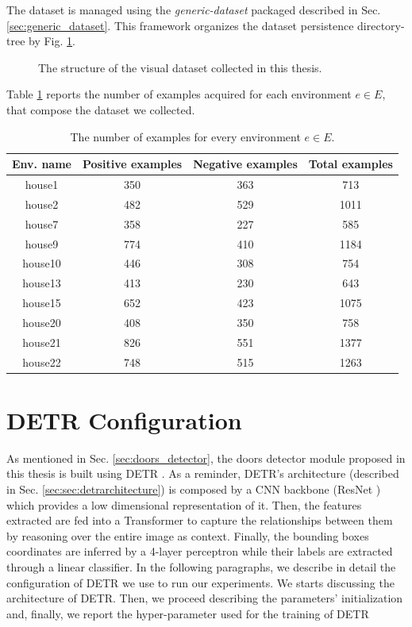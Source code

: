 The dataset is managed using the \textit{generic-dataset} packaged described in Sec. \ref{sec:generic_dataset}. This framework organizes the dataset persistence directory-tree by Fig. \ref{fig:organization_dataset}.

\begin{figure}[h!]
	\centering
	\begin{minipage}{7cm}
	\end{minipage}
	\caption{The structure of the visual dataset collected in this thesis. }
	\label{fig:organization_dataset}
\end{figure} 

Table \ref{tab:dataset_examples_number} reports the number of examples acquired for each environment $e \in E$, that compose the dataset we collected.

\begin{table}[h!]
	\centering
	\begin{tabular}{cccc}

	\toprule
	\textbf{Env. name} & \textbf{Positive examples} & \textbf{Negative examples} & \textbf{Total
		examples}\tabularnewline
	\midrule
	house1 & 350 & 363 & 713\tabularnewline
	house2 & 482 & 529 & 1011\tabularnewline
	house7 & 358 & 227 & 585\tabularnewline
	house9 & 774 & 410 & 1184\tabularnewline
	house10 & 446 & 308 & 754\tabularnewline
	house13 & 413 & 230 & 643\tabularnewline
	house15 & 652 & 423 & 1075\tabularnewline
	house20 & 408 & 350 & 758\tabularnewline
	house21 & 826 & 551 & 1377\tabularnewline
	house22 & 748 & 515 & 1263\tabularnewline
	\bottomrule
	\end{tabular}
	\caption{The number of examples for every environment $e \in E$.}
	\label{tab:dataset_examples_number}
\end{table}

\section{DETR Configuration}

As mentioned in Sec. \ref{sec:doors_detector}, the doors detector module proposed in this thesis is built using DETR \cite{detr}. As a reminder, DETR's architecture (described in Sec. \ref{sec:sec:detrarchitecture}) is composed by a CNN backbone (ResNet \cite{resnet}) which  provides a low dimensional representation of it. Then, the features extracted are fed into a Transformer \cite{transformer} to capture the relationships between them by reasoning over the entire image as context. Finally, the bounding boxes coordinates are inferred by a 4-layer perceptron while their labels are extracted through a linear classifier. In the following paragraphs, we describe in detail the configuration of DETR we use to run our experiments. We starts discussing the architecture of DETR. Then, we proceed describing the parameters' initialization and, finally, we report the hyper-parameter used for the training of DETR

